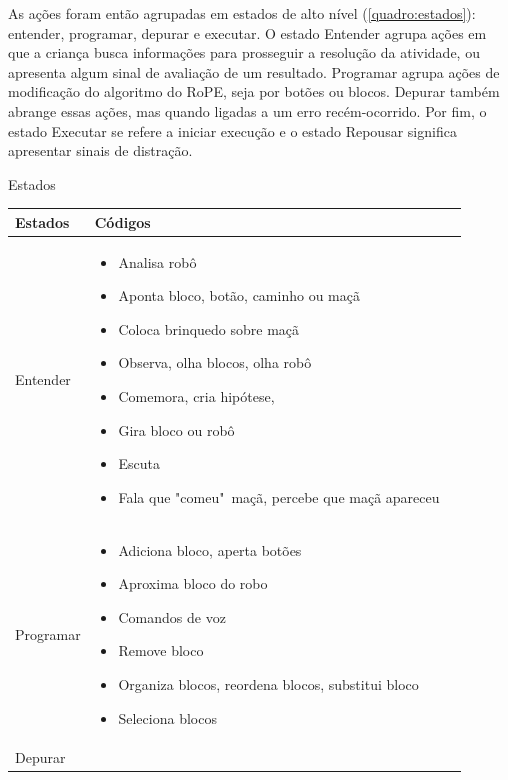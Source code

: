  As ações foram então agrupadas em estados de alto nível (\autoref{quadro:estados}): entender, programar, depurar e executar. O estado Entender agrupa ações em que a criança busca informações para prosseguir a resolução da atividade, ou apresenta algum sinal de avaliação de um resultado. Programar agrupa ações de modificação do algoritmo do RoPE, seja por botões ou blocos. Depurar também abrange essas ações, mas quando ligadas a um erro recém-ocorrido. Por fim, o estado Executar se refere a iniciar execução e o estado Repousar significa apresentar sinais de distração.

 \begin{quadro}[!h]
    \begin{table_env}
    \caption{Estados}
     \label{quadro:estados}
     \begin{tabular}{@{}l m{} c@{}}
        \toprule
        \textbf{Estados} & \textbf{Códigos}  \\ \midrule
        Entender & 

        \begin{itemize}
            \item Analisa robô
            \item Aponta bloco, botão, caminho ou maçã
            \item Coloca brinquedo sobre maçã
            \item Observa, olha blocos, olha robô
            \item Comemora, cria hipótese,
            \item Gira bloco ou robô
            \item Escuta
            \item Fala que "comeu"\ maçã, percebe que maçã apareceu
        \end{itemize} \\ \hline
        Programar & 

        \begin{itemize}
            \item Adiciona bloco, aperta botões
            \item Aproxima bloco do robo
            \item Comandos de voz
            \item Remove bloco
            \item Organiza blocos, reordena blocos, substitui bloco
            \item Seleciona blocos
        \end{itemize}
        \\ \hline
        Depurar & 


\end{tabular}
\end{table_env}
\end{quadro}
